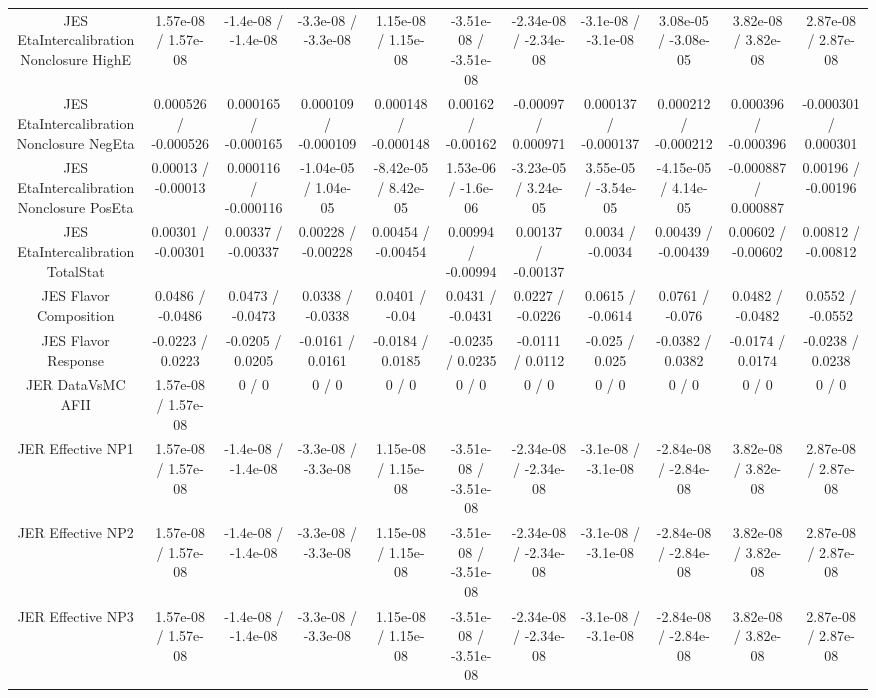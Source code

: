 \begin{table}[htbp]
\begin{center}
\begin{tabular}{|c|c|c|c|c|c|c|c|c|c|c|}
  JES EtaIntercalibration Nonclosure HighE & 1.57e-08 / 1.57e-08 & -1.4e-08 / -1.4e-08 & -3.3e-08 / -3.3e-08 & 1.15e-08 / 1.15e-08 & -3.51e-08 / -3.51e-08 & -2.34e-08 / -2.34e-08 & -3.1e-08 / -3.1e-08 & 3.08e-05 / -3.08e-05 & 3.82e-08 / 3.82e-08 & 2.87e-08 / 2.87e-08 \\ 
  JES EtaIntercalibration Nonclosure NegEta & 0.000526 / -0.000526 & 0.000165 / -0.000165 & 0.000109 / -0.000109 & 0.000148 / -0.000148 & 0.00162 / -0.00162 & -0.00097 / 0.000971 & 0.000137 / -0.000137 & 0.000212 / -0.000212 & 0.000396 / -0.000396 & -0.000301 / 0.000301 \\ 
  JES EtaIntercalibration Nonclosure PosEta & 0.00013 / -0.00013 & 0.000116 / -0.000116 & -1.04e-05 / 1.04e-05 & -8.42e-05 / 8.42e-05 & 1.53e-06 / -1.6e-06 & -3.23e-05 / 3.24e-05 & 3.55e-05 / -3.54e-05 & -4.15e-05 / 4.14e-05 & -0.000887 / 0.000887 & 0.00196 / -0.00196 \\ 
  JES EtaIntercalibration TotalStat & 0.00301 / -0.00301 & 0.00337 / -0.00337 & 0.00228 / -0.00228 & 0.00454 / -0.00454 & 0.00994 / -0.00994 & 0.00137 / -0.00137 & 0.0034 / -0.0034 & 0.00439 / -0.00439 & 0.00602 / -0.00602 & 0.00812 / -0.00812 \\ 
  JES Flavor Composition & 0.0486 / -0.0486 & 0.0473 / -0.0473 & 0.0338 / -0.0338 & 0.0401 / -0.04 & 0.0431 / -0.0431 & 0.0227 / -0.0226 & 0.0615 / -0.0614 & 0.0761 / -0.076 & 0.0482 / -0.0482 & 0.0552 / -0.0552 \\ 
  JES Flavor Response & -0.0223 / 0.0223 & -0.0205 / 0.0205 & -0.0161 / 0.0161 & -0.0184 / 0.0185 & -0.0235 / 0.0235 & -0.0111 / 0.0112 & -0.025 / 0.025 & -0.0382 / 0.0382 & -0.0174 / 0.0174 & -0.0238 / 0.0238 \\ 
  JER DataVsMC AFII & 1.57e-08 / 1.57e-08 & 0 / 0 & 0 / 0 & 0 / 0 & 0 / 0 & 0 / 0 & 0 / 0 & 0 / 0 & 0 / 0 & 0 / 0 \\ 
  JER Effective NP1 & 1.57e-08 / 1.57e-08 & -1.4e-08 / -1.4e-08 & -3.3e-08 / -3.3e-08 & 1.15e-08 / 1.15e-08 & -3.51e-08 / -3.51e-08 & -2.34e-08 / -2.34e-08 & -3.1e-08 / -3.1e-08 & -2.84e-08 / -2.84e-08 & 3.82e-08 / 3.82e-08 & 2.87e-08 / 2.87e-08 \\ 
  JER Effective NP2 & 1.57e-08 / 1.57e-08 & -1.4e-08 / -1.4e-08 & -3.3e-08 / -3.3e-08 & 1.15e-08 / 1.15e-08 & -3.51e-08 / -3.51e-08 & -2.34e-08 / -2.34e-08 & -3.1e-08 / -3.1e-08 & -2.84e-08 / -2.84e-08 & 3.82e-08 / 3.82e-08 & 2.87e-08 / 2.87e-08 \\ 
  JER Effective NP3 & 1.57e-08 / 1.57e-08 & -1.4e-08 / -1.4e-08 & -3.3e-08 / -3.3e-08 & 1.15e-08 / 1.15e-08 & -3.51e-08 / -3.51e-08 & -2.34e-08 / -2.34e-08 & -3.1e-08 / -3.1e-08 & -2.84e-08 / -2.84e-08 & 3.82e-08 / 3.82e-08 & 2.87e-08 / 2.87e-08 \\ 

\end{tabular}
\end{center}
\end{table}
